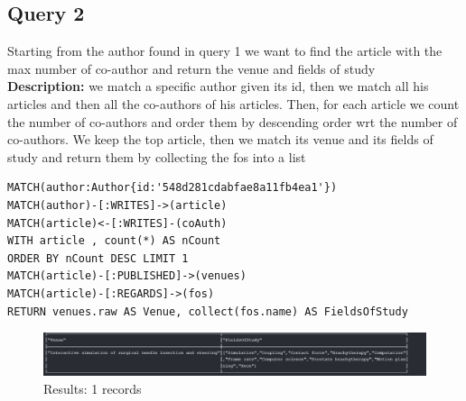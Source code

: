 \documentclass{Configuration_Files/PoliMi3i_thesis}
\begin{document}
\subsection{Query 2}
Starting from the author found in query 1 we want to find the article with the max number of co-author and return the venue and fields of study\\
\textbf{Description:} we match a specific author given its id, then we match all his articles and then all the co-authors of his articles.
Then, for each article we count the number of co-authors and order them by descending order wrt the number of co-authors.
We keep the top article, then we match its venue and its fields of study and return them by collecting the fos into a list
\begin{lstlisting}[language=cypher, label=lst:cypher-example]
MATCH(author:Author{id:'548d281cdabfae8a11fb4ea1'})
MATCH(author)-[:WRITES]->(article)
MATCH(article)<-[:WRITES]-(coAuth)
WITH article , count(*) AS nCount
ORDER BY nCount DESC LIMIT 1
MATCH(article)-[:PUBLISHED]->(venues)
MATCH(article)-[:REGARDS]->(fos)
RETURN venues.raw AS Venue, collect(fos.name) AS FieldsOfStudy
\end{lstlisting}
\begin{figure}[H]
\centering
\includegraphics[width=1\textwidth]{query/query2.PNG}
\caption{Results: 1 records}
\label{fig:query2}
\end{figure}
\end{document}
